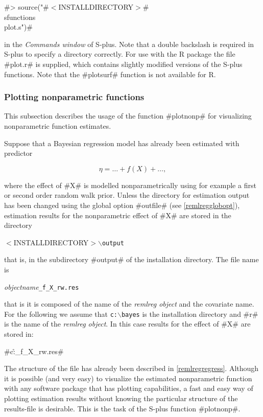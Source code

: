 #> source("#$<$INSTALLDIRECTORY$>$#\\sfunctions\\plot.s")#

in the {\em Commands window} of S-plus. Note that a double backslash
is required in S-plus to specify a directory correctly.
For use with the R package the file #plot.r# is supplied, which
contains slightly modified versions of the S-plus functions. Note
that the #plotsurf# function is not available for R.


\subsubsection{Plotting nonparametric functions}
\label{remlregplotnonpsplus}  

This subsection describes the usage of the function #plotnonp# for
visualizing nonparametric function estimates.

Suppose that a Bayesian regression model has already been
estimated with predictor

$$
\eta = \dots + f(X) + \dots,
$$

where the effect of #X# is modelled nonparametrically using for
example a first or second order random walk prior. Unless the
directory for estimation output has been changed using the global
option #outfile# (see \autoref{remlregglobopt}), estimation
results for the nonparametric effect of #X# are stored in the
directory

$<$INSTALLDIRECTORY$>$\texttt{$\backslash$output}

that is, in the subdirectory #output# of the installation
directory. The file name is

{\em objectname}\texttt{\_f\_X\_rw.res}

that is it is composed of the name of the {\em remlreg object} and
the covariate name. For the following we assume that
\texttt{c:$\backslash$bayes} is the installation directory and #r#
is the name of the {\em remlreg object}. In this case results for
the effect of #X# are stored in:

#c:\bayes\output\r_f_X_rw.res#

The structure of the file has already been described in
\autoref{remlregregress}. Although it is possible (and very easy)
to visualize the estimated nonparametric function with any
software package that has plotting capabilities, a fast and easy
way of plotting estimation results without knowing the particular
structure of the results-file is desirable. This is the task of
the S-plus function #plotnonp#.

